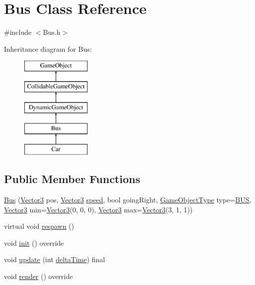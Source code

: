 \hypertarget{class_bus}{}\section{Bus Class Reference}
\label{class_bus}


{\ttfamily \#include $<$Bus.\+h$>$}

Inheritance diagram for Bus\+:\begin{figure}[H]
\begin{center}
\leavevmode
\includegraphics[height=5.000000cm]{class_bus}
\end{center}
\end{figure}
\subsection*{Public Member Functions}
\begin{DoxyCompactItemize}
\item 
\hyperlink{class_bus_a262505182585ed32d38dda38ab68147f}{Bus} (\hyperlink{class_vector3}{Vector3} pos, \hyperlink{class_vector3}{Vector3} \hyperlink{class_dynamic_game_object_a54cb8a3a5fe8314cd5751f223b2b49ae}{speed}, bool going\+Right, \hyperlink{_game_object_8h_a57678b60d65afb213d04a6b090c64a08}{Game\+Object\+Type} type=\hyperlink{_game_object_8h_a57678b60d65afb213d04a6b090c64a08a885a6a40e3fde5dfec3db7fefea61f9b}{B\+US}, \hyperlink{class_vector3}{Vector3} min=\hyperlink{class_vector3}{Vector3}(0, 0, 0), \hyperlink{class_vector3}{Vector3} max=\hyperlink{class_vector3}{Vector3}(3, 1, 1))
\item 
virtual void \hyperlink{class_bus_a4f917c97b2fc287fc9b01795250f591d}{respawn} ()
\item 
void \hyperlink{class_bus_a7bff316b767441b92f8e82f17a44fbf7}{init} () override
\item 
void \hyperlink{class_bus_ad07157ce2a50211ea599d040da7a4517}{update} (int \hyperlink{_game_manager_8h_afea6a95c7a1c119b7106a4c735eb259d}{delta\+Time}) final
\item 
void \hyperlink{class_bus_a0fe709af4b2ca86583d8647f323c231c}{render} () override
\end{DoxyCompactItemize}
